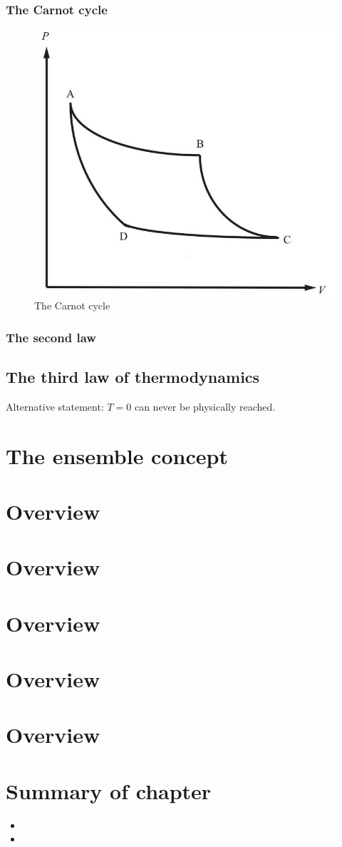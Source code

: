 \subsubsection{The Carnot cycle}
\begin{figure}[!h]
	\centering
	\includegraphics[width=0.6\linewidth]{figure/2.3-carnot}
	\caption{The Carnot cycle}
	\label{fig:2}
\end{figure}


\subsubsection{The second law}


\subsection{The third law of thermodynamics}

Alternative statement: $T=0$ can never be physically reached.


\section{The ensemble concept}





\section{Overview}
\section{Overview}
\section{Overview}
\section{Overview}
\section{Overview}

\section*{Summary of chapter}

\begin{itemize}
	\item 
	\item 
\end{itemize}